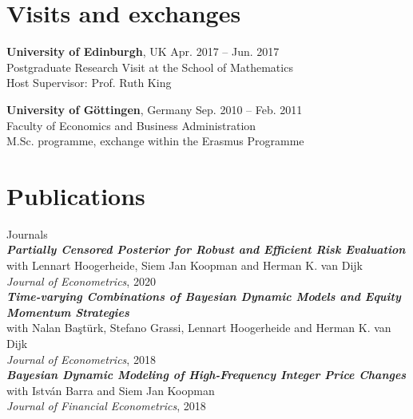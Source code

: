 \documentclass[margin,line]{resume}
\begin{document}
\begin{resume}
\vspace{-5mm}
    
\section{\mysidestyle Visits and exchanges}
    \textbf{University of Edinburgh},  UK \hfill Apr. 2017 -- Jun. 2017\\
	Postgraduate Research Visit at the School of Mathematics\\ 
    Host Supervisor: Prof. Ruth King
  
    \vspace{-1mm}

	\textbf{University of G{\"o}ttingen}, Germany   \hfill Sep. 2010 -- Feb. 2011	\\
    Faculty of Economics and Business Administration \\M.Sc. programme, exchange within the Erasmus Programme
        

\vspace{-2mm}    
\section{\mysidestyle Publications}
{\mysidestyle Journals\vspace{1mm}}\\
\textit{\textbf{Partially Censored Posterior for Robust and Efficient Risk Evaluation}}\\
	with Lennart Hoogerheide, Siem Jan Koopman and Herman K. van Dijk\\
	\textit{Journal of Econometrics}, 2020\vspace{2mm}\\ 
\textit{\textbf{Time-varying Combinations of Bayesian Dynamic Models and Equity Momentum Strategies}}\\
	with Nalan Ba\c{s}t\"{u}rk, Stefano Grassi, Lennart Hoogerheide and Herman K. van Dijk\\
	\textit{Journal of Econometrics}, 2018 \vspace{2mm} \\
\textit{\textbf{Bayesian Dynamic Modeling of High-Frequency Integer Price Changes}}\\
	with Istv\'{a}n Barra  and Siem Jan Koopman\\
	\textit{Journal of Financial Econometrics}, 2018\\ 


\end{resume}
\end{document}
